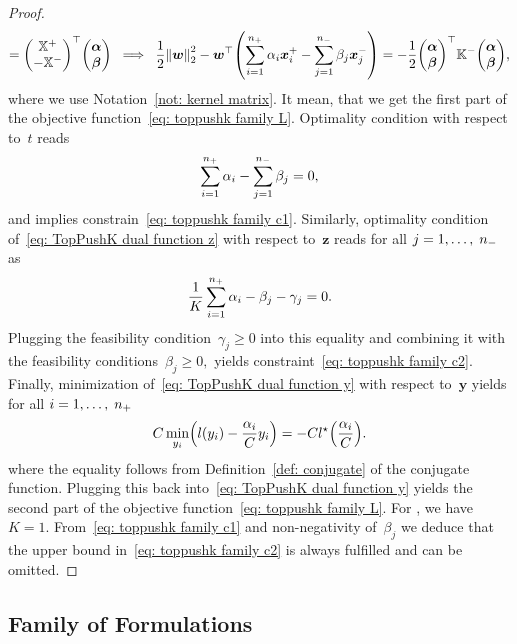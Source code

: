 \begin{proof}
\begin{equation*}
      = \Matrix{\X^+ \\ - \X^-}^\top \vecab
    \; \implies \;
    \frac{1}{2} \norm{\bm{w}}_{2}^{2} - \bm{w}^{\top} \Brac{\sum_{i = 1}^{\npos} \alpha_i \bm{x}^+_i - \sum_{j = 1}^{\nneg} \beta_j \bm{x}^-_j}
      = - \frac{1}{2} \vecab^{\top} \Kneg \vecab,
  \end{equation*}
  where we use Notation~\ref{not: kernel matrix}. It mean, that we get the first part of the objective function~\eqref{eq: toppushk family L}. Optimality condition with respect to~$t$ reads 
  \begin{equation*}
    \sum_{i = 1}^{n_{+}} \alpha_i - \sum_{j = 1}^{n_{-}} \beta_j = 0,
  \end{equation*}
  and implies constrain~\eqref{eq: toppushk family c1}. Similarly, optimality condition of~\eqref{eq: TopPushK dual function z} with respect to~$\bm{z}$ reads for all $j = 1, \ldots, \; n_{-}$ as 
  \begin{equation*}
    \frac{1}{K} \sum_{i = 1}^{n_{+}} \alpha_i - \beta_j - \gamma_j = 0.
  \end{equation*}
  Plugging the feasibility condition~$\gamma_j \geq 0$ into this equality and combining it with the feasibility conditions~$\beta_j \geq 0,$ yields constraint~\eqref{eq: toppushk family c2}. Finally, minimization of~\eqref{eq: TopPushK dual function y} with respect to~$\bm{y}$ yields for all $i = 1, \ldots, \; n_{+}$ 
  \begin{equation*}
    C \min_{y_i} \Brac{l(y_i) - \frac{\alpha_i}{C} y_i} = - C l^{\star} \Brac{\frac{\alpha_i}{C}}.
  \end{equation*}
  where the equality follows from Definition~\ref{def: conjugate} of the conjugate function. Plugging this back into~\eqref{eq: TopPushK dual function y} yields the second part of the objective function~\eqref{eq: toppushk family L}. For \TopPush, we have~$K = 1.$ From~\eqref{eq: toppushk family c1} and non-negativity of~$\beta_j$ we deduce that the upper bound in~\eqref{eq: toppushk family c2} is always fulfilled and can be omitted.
\end{proof}

\subsection{Family of \PatMat Formulations}

\patdual*

\pagebreak

